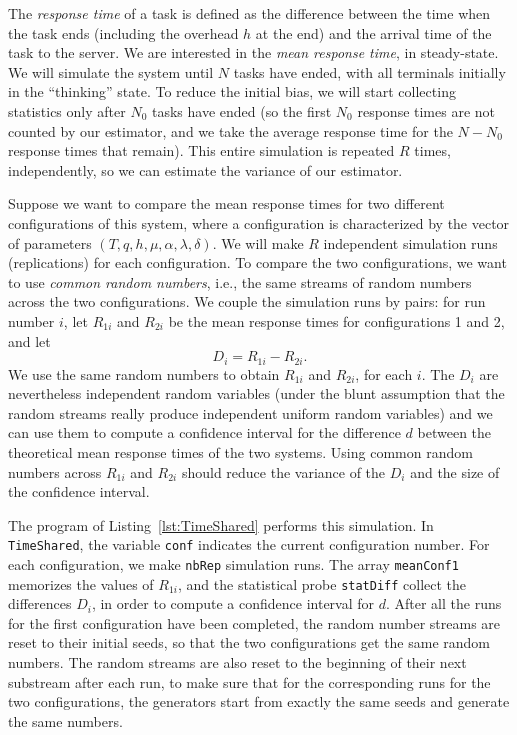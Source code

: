 The {\em response time\/} of a task is defined as the difference
between the time when the task ends (including the overhead $h$ at the
end) and the arrival time of the task to the server.
We are interested in the {\em mean response time}, in steady-state.
We will simulate the system until $N$ tasks have ended, with all
terminals initially in the ``thinking'' state.
To reduce the initial bias, we will start collecting statistics only
after $N_0$ tasks have ended (so the first $N_0$ response times are
not counted by our estimator, and we take the average response
time for the $N-N_0$ response times that remain).
This entire simulation is repeated $R$ times, independently,
so we can estimate the variance of our estimator.


Suppose we want to compare the mean response times for two 
different configurations of this system, where a configuration is
characterized by the vector of parameters $(T, q, h, \mu, \alpha, \lambda, \delta)$.
We will make $R$ independent simulation runs (replications)
for each configuration.
To compare the two configurations, we want to use {\em common random
numbers}, i.e., the same streams of random numbers 
across the two configurations.
We couple the simulation runs by pairs: 
for run number $i$, let $R_{1i}$ and $R_{2i}$ be the mean response times 
for configurations 1 and 2, and let
      $$D_i = R_{1i} - R_{2i}.$$
We use the same random numbers to obtain $R_{1i}$ and $R_{2i}$,
for each $i$.
The $D_i$ are nevertheless independent random variables (under the blunt
assumption that the random streams really produce independent uniform
random variables) and we can use them to compute a confidence interval
for the difference $d$ between the theoretical mean response times of the
two systems.
Using common random numbers across $R_{1i}$ and $R_{2i}$ should reduce
the variance of the $D_i$ and the size of the confidence interval.

\bigskip


The program of Listing~\ref{lst:TimeShared} performs this simulation.
In \texttt{TimeShared}, the variable \texttt{conf} indicates the current
configuration number.  For each configuration, 
we make \texttt{nbRep} simulation runs.
The array \texttt{meanConf1} memorizes the values of $R_{1i}$, and the
statistical probe \texttt{statDiff} collect the differences $D_i$, in
order to compute a confidence interval for $d$.
After all the runs for the first configuration have been completed,
the random number streams are reset to their initial seeds,
so that the two configurations get the same random numbers.
The random streams are also reset to the beginning of their next
substream after each run, to make sure that for the corresponding runs
for the two configurations, the generators start from exactly the same
seeds and generate the same numbers.

